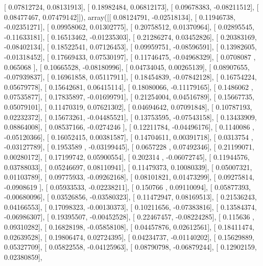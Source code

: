 \documentclass{article}
\begin{document}
       [ 0.07812724,  0.08131913],
       [ 0.18982484,  0.06812173],
       [ 0.09678383, -0.08211512],
       [ 0.08477467,  0.07479142]]), array([[ 0.08124791, -0.02518134],
       [ 0.11946738, -0.02351271],
       [ 0.09958062,  0.01302775],
       [ 0.20758512,  0.01370964],
       [ 0.02895545, -0.11633181],
       [ 0.16513462, -0.01235303],
       [ 0.21286274,  0.03452826],
       [ 0.20383169, -0.08402134],
       [ 0.18522541,  0.07126453],
       [ 0.09959751, -0.08596591],
       [ 0.13982605, -0.01318452],
       [ 0.17669433,  0.07530197],
       [ 0.11746475, -0.04968329],
       [ 0.0708087 ,  0.065068  ],
       [ 0.10665528, -0.08180996],
       [ 0.04734045,  0.00265139],
       [ 0.08907655, -0.07939837],
       [ 0.16961858,  0.05117911],
       [ 0.18454839, -0.07842128],
       [ 0.16754224,  0.05679778],
       [ 0.15642681,  0.06415114],
       [ 0.18080066, -0.11179165],
       [ 0.1486062 ,  0.07535877],
       [ 0.17835897, -0.01699791],
       [ 0.21254004,  0.04516789],
       [ 0.15667735,  0.05079101],
       [ 0.11470319,  0.07621302],
       [ 0.04694642,  0.07091848],
       [ 0.10787193,  0.02232372],
       [ 0.15673261, -0.04485521],
       [ 0.13753595, -0.07543158],
       [ 0.13433909,  0.08864008],
       [ 0.08537166, -0.0274246 ],
       [ 0.12211784, -0.04496176],
       [ 0.1140086 , -0.05120366],
       [ 0.16052415,  0.00381587],
       [ 0.14704611,  0.00391718],
       [ 0.0313754 , -0.03127789],
       [ 0.1953589 , -0.03199445],
       [ 0.0657228 ,  0.07492346],
       [ 0.21199071,  0.00280172],
       [ 0.17199742,  0.05900554],
       [ 0.202314  , -0.06072745],
       [ 0.11944576,  0.03788033],
       [ 0.05246697,  0.08110941],
       [ 0.11479373,  0.10080339],
       [ 0.05007321,  0.01103789],
       [ 0.09775933, -0.09262168],
       [ 0.08101821,  0.01473299],
       [ 0.09275814, -0.0908619 ],
       [ 0.05933533, -0.02238211],
       [ 0.150766  ,  0.09110094],
       [ 0.05877393, -0.00680096],
       [ 0.03526856, -0.03580323],
       [ 0.11472947,  0.08169513],
       [ 0.21536243,  0.04166553],
       [ 0.17098323, -0.00130373],
       [ 0.10211656, -0.07383816],
       [ 0.13584374, -0.06986307],
       [ 0.19395507, -0.00452528],
       [ 0.22467457, -0.08224285],
       [ 0.115636  ,  0.09310282],
       [ 0.16828198, -0.05858108],
       [ 0.04457876,  0.02612561],
       [ 0.18411474,  0.02639528],
       [ 0.19806474,  0.02724395],
       [ 0.04234737, -0.01140202],
       [ 0.15629889,  0.05327709],
       [ 0.05822558, -0.04125963],
       [ 0.08790798, -0.06879244],
       [ 0.12902159,  0.02380859],
\end{document}
